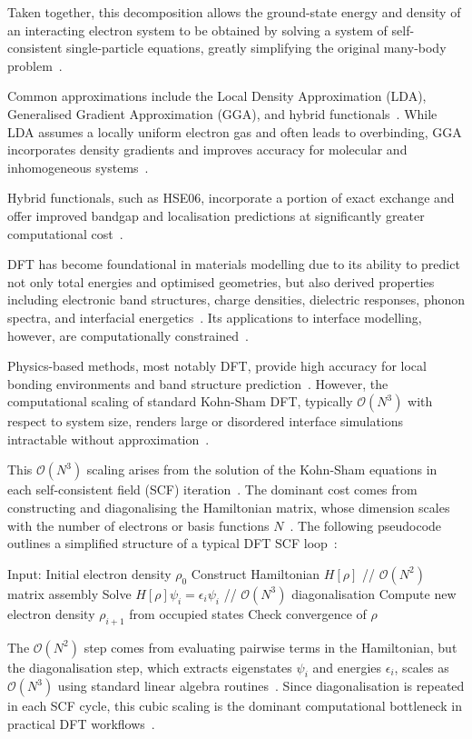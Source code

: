 Taken together, this decomposition allows the ground-state energy and density of an interacting electron system to be obtained by solving a system of self-consistent single-particle equations, greatly simplifying the original many-body problem~\nocite{}.

Common approximations include the Local Density Approximation (LDA), Generalised Gradient Approximation (GGA), and hybrid functionals~\cite{Arantes2007-ea}.
While LDA assumes a locally uniform electron gas and often leads to overbinding, GGA incorporates density gradients and improves accuracy for molecular and inhomogeneous systems~\cite{Rosen2022-pw}.

Hybrid functionals, such as HSE06, incorporate a portion of exact exchange and offer improved bandgap and localisation predictions at significantly greater computational cost~\cite{Rosen2022-pw}.

DFT has become foundational in materials modelling due to its ability to predict not only total energies and optimised geometries, but also derived properties including electronic band structures, charge densities, dielectric responses, phonon spectra, and interfacial energetics~\nocite{}.
Its applications to interface modelling, however, are computationally constrained~\cite{Gerber2023-yd, Leung2020-tv}.

Physics-based methods, most notably DFT, provide high accuracy for local bonding environments and band structure prediction~\cite{Abdulsattar2012-oz, Leung2020-tv}.
However, the computational scaling of standard Kohn-Sham DFT, typically $\mathcal{O}(N^3)$ with respect to system size, renders large or disordered interface simulations intractable without approximation~\cite{Batatia2022-xz}.

This $\mathcal{O}(N^3)$ scaling arises from the solution of the Kohn-Sham equations in each self-consistent field (SCF) iteration~\nocite{}.
The dominant cost comes from constructing and diagonalising the Hamiltonian matrix, whose dimension scales with the number of electrons or basis functions $N$~\nocite{}.
The following pseudocode outlines a simplified structure of a typical DFT SCF loop~\nocite{}:
\begin{algorithmic}
\State Input: Initial electron density $\rho_0$
\Repeat
    \State Construct Hamiltonian $H[\rho]$ \hfill // $\mathcal{O}(N^2)$ matrix assembly
    \State Solve $H[\rho] \psi_i = \epsilon_i \psi_i$ \hfill // $\mathcal{O}(N^3)$ diagonalisation
    \State Compute new electron density $\rho_{i+1}$ from occupied states
    \State Check convergence of $\rho$
\end{algorithmic}
The $\mathcal{O}(N^2)$ step comes from evaluating pairwise terms in the Hamiltonian, but the diagonalisation step, which extracts eigenstates $\psi_i$ and energies $\epsilon_i$, scales as $\mathcal{O}(N^3)$ using standard linear algebra routines~\nocite{}.
Since diagonalisation is repeated in each SCF cycle, this cubic scaling is the dominant computational bottleneck in practical DFT workflows~\nocite{}.

